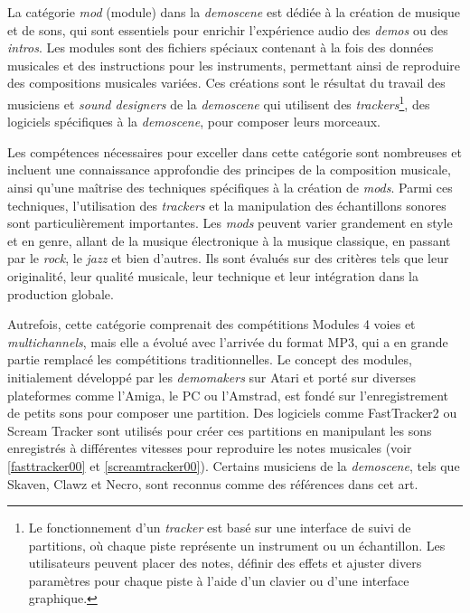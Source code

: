 La catégorie \textit{mod} (module) dans la \textit{demoscene} est dédiée à la création de musique et de sons, qui sont essentiels pour enrichir l'expérience audio des \textit{demos} ou des \textit{intros}. Les modules sont des fichiers spéciaux contenant à la fois des données musicales et des instructions pour les instruments, permettant ainsi de reproduire des compositions musicales variées. Ces créations sont le résultat du travail des musiciens et \textit{sound designers} de la \textit{demoscene} qui utilisent des \textit{trackers}\footnote{Le fonctionnement d'un \textit{tracker} est basé sur une interface de suivi de partitions, où chaque piste représente un instrument ou un échantillon. Les utilisateurs peuvent placer des notes, définir des effets et ajuster divers paramètres pour chaque piste à l'aide d'un clavier ou d'une interface graphique.}, des logiciels spécifiques à la \textit{demoscene}, pour composer leurs morceaux.

Les compétences nécessaires pour exceller dans cette catégorie sont nombreuses et incluent une connaissance approfondie des principes de la composition musicale, ainsi qu'une maîtrise des techniques spécifiques à la création de \textit{mods}. Parmi ces techniques, l'utilisation des \textit{trackers} et la manipulation des échantillons sonores sont particulièrement importantes. Les \textit{mods} peuvent varier grandement en style et en genre, allant de la musique électronique à la musique classique, en passant par le \textit{rock}, le \textit{jazz} et bien d'autres. Ils sont évalués sur des critères tels que leur originalité, leur qualité musicale, leur technique et leur intégration dans la production globale.



Autrefois, cette catégorie comprenait des compétitions Modules 4 voies et \textit{multichannels}, mais elle a évolué avec l'arrivée du format MP3, qui a en grande partie remplacé les compétitions traditionnelles. Le concept des modules, initialement développé par les \textit{demomakers} sur Atari et porté sur diverses plateformes comme l'Amiga, le PC ou l'Amstrad, est fondé sur l'enregistrement de petits sons pour composer une partition. Des logiciels comme FastTracker2 ou Scream Tracker sont utilisés pour créer ces partitions en manipulant les sons enregistrés à différentes vitesses pour reproduire les notes musicales (voir \ref{fasttracker00} et \ref{screamtracker00}). Certains musiciens de la \textit{demoscene}, tels que Skaven, Clawz et Necro, sont reconnus comme des références dans cet art.

